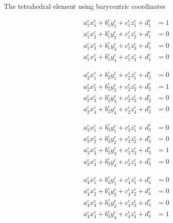 \documentclass[handout]{beamer}
{
\usepackage{fullpage}
\usepackage{hyperref}
\usepackage{amssymb} 
}
\begin{document}
\begin{frame}{The tetrahedral element using barycentric coordinates}
\centering
\scriptsize
\begin{minipage}{0.45\textwidth}
\begin{align*}
a^e_1 x_1^e + b^e_1 y_1^e + c^e_1 z_1^e + d^e_1 &= 1   \\
a^e_1 x_2^e + b^e_1 y_2^e + c^e_1 z_2^e + d^e_1 &= 0   \\
a^e_1 x_3^e + b^e_1 y_3^e + c^e_1 z_3^e + d^e_1 &= 0   \\
a^e_1 x_4^e + b^e_1 y_4^e + c^e_1 z_4^e + d^e_1 &= 0 
\end{align*}
\end{minipage}
\begin{minipage}{0.45\textwidth}
\begin{align*}
a^e_2 x_1^e + b^e_2 y_1^e + c^e_2 z_1^e + d^e_2 &= 0   \\
a^e_2 x_2^e + b^e_2 y_2^e + c^e_2 z_2^e + d^e_2 &= 1   \\
a^e_2 x_3^e + b^e_2 y_3^e + c^e_2 z_3^e + d^e_2 &= 0   \\
a^e_2 x_4^e + b^e_2 y_4^e + c^e_2 z_4^e + d^e_2 &= 0  
\end{align*}
\end{minipage}
\begin{minipage}{0.45\textwidth}
\begin{align*}
a^e_3 x_1^e + b^e_3 y_1^e + c^e_3 z_1^e + d^e_3 &= 0   \\
a^e_3 x_2^e + b^e_3 y_2^e + c^e_3 z_2^e + d^e_3 &= 0   \\
a^e_3 x_3^e + b^e_3 y_3^e + c^e_3 z_3^e + d^e_3 &= 1   \\
a^e_3 x_4^e + b^e_3 y_4^e + c^e_3 z_4^e + d^e_3 &= 0  
\end{align*}
\end{minipage}
\begin{minipage}{0.45\textwidth}
\begin{align*}
a^e_4 x_1^e + b^e_4 y_1^e + c^e_4 z_1^e + d^e_4 &= 0   \\
a^e_4 x_2^e + b^e_4 y_2^e + c^e_4 z_2^e + d^e_4 &= 0   \\
a^e_4 x_3^e + b^e_4 y_3^e + c^e_4 z_3^e + d^e_4 &= 0   \\
a^e_4 x_4^e + b^e_4 y_4^e + c^e_4 z_4^e + d^e_4 &= 1  
\end{align*}
\end{minipage}

\bigskip


\end{frame}
\end{document}

